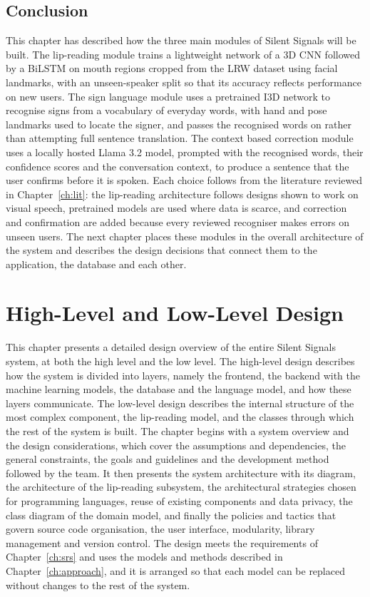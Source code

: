 \documentclass{FastFyp}
\begin{document}
\section{Conclusion}
This chapter has described how the three main modules of Silent Signals will be built. The lip-reading module trains a lightweight network of a 3D CNN followed by a BiLSTM on mouth regions cropped from the LRW dataset using facial landmarks, with an unseen-speaker split so that its accuracy reflects performance on new users. The sign language module uses a pretrained I3D network to recognise signs from a vocabulary of everyday words, with hand and pose landmarks used to locate the signer, and passes the recognised words on rather than attempting full sentence translation. The context based correction module uses a locally hosted Llama 3.2 model, prompted with the recognised words, their confidence scores and the conversation context, to produce a sentence that the user confirms before it is spoken. Each choice follows from the literature reviewed in Chapter~\ref{ch:lit}: the lip-reading architecture follows designs shown to work on visual speech, pretrained models are used where data is scarce, and correction and confirmation are added because every reviewed recogniser makes errors on unseen users. The next chapter places these modules in the overall architecture of the system and describes the design decisions that connect them to the application, the database and each other.

\chapter{High-Level and Low-Level Design}
\label{ch:design}
This chapter presents a detailed design overview of the entire Silent Signals system, at both the high level and the low level. The high-level design describes how the system is divided into layers, namely the frontend, the backend with the machine learning models, the database and the language model, and how these layers communicate. The low-level design describes the internal structure of the most complex component, the lip-reading model, and the classes through which the rest of the system is built. The chapter begins with a system overview and the design considerations, which cover the assumptions and dependencies, the general constraints, the goals and guidelines and the development method followed by the team. It then presents the system architecture with its diagram, the architecture of the lip-reading subsystem, the architectural strategies chosen for programming languages, reuse of existing components and data privacy, the class diagram of the domain model, and finally the policies and tactics that govern source code organisation, the user interface, modularity, library management and version control. The design meets the requirements of Chapter~\ref{ch:srs} and uses the models and methods described in Chapter~\ref{ch:approach}, and it is arranged so that each model can be replaced without changes to the rest of the system.
\end{document}
